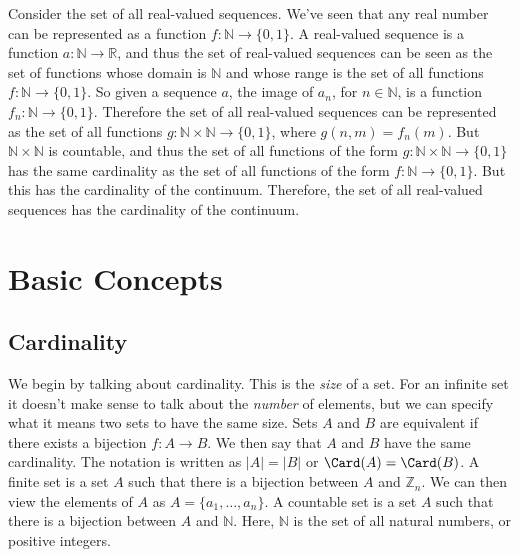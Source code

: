         \begin{lexample}
            Consider the set of all real-valued sequences. We've seen
            that any real number can be represented as a function
            $f:\mathbb{N}\rightarrow\{0,1\}$. A real-valued sequence
            is a function $a:\mathbb{N}\rightarrow\mathbb{R}$, and
            thus the set of real-valued sequences can be seen as the
            set of functions whose domain is $\mathbb{N}$ and whose
            range is the set of all functions
            $f:\mathbb{N}\rightarrow\{0,1\}$. So given a sequence
            $a$, the image of $a_{n}$, for $n\in\mathbb{N}$, is a
            function $f_{n}:\mathbb{N}\rightarrow\{0,1\}$. Therefore
            the set of all real-valued sequences can be represented
            as the set of all functions
            $g:\mathbb{N}\times\mathbb{N}\rightarrow\{0,1\}$, where
            $g(n,m)=f_{n}(m)$. But $\mathbb{N}\times\mathbb{N}$ is
            countable, and thus the set of all functions of the form
            $g:\mathbb{N}\times\mathbb{N}\rightarrow\{0,1\}$ has the
            same cardinality as the set of all functions of the form
            $f:\mathbb{N}\rightarrow\{0,1\}$. But this has the
            cardinality of the continuum. Therefore, the set of all
            real-valued sequences has the cardinality of the continuum.
        \end{lexample}
\section{Basic Concepts}
    \subsection{Cardinality}
        We begin by talking about cardinality. This is the
        \textit{size} of a set. For an infinite set it
        doesn't make sense to talk about the \textit{number}
        of elements, but we can specify what it means two sets
        to have the same size. Sets $A$ and $B$ are equivalent
        if there exists a bijection $f:A\rightarrow{B}$.
        We then say that $A$ and $B$ have the same cardinality.
        The notation is written as $|A|=|B|$ or
        $\Card(A)=\Card(B)$. A finite set is a set $A$ such that
        there is a bijection between $A$ and $\mathbb{Z}_{n}$.
        We can then view the elements of $A$ as
        $A=\{a_{1},\hdots,a_{n}\}$. A countable set is a set
        $A$ such that there is a bijection between $A$ and
        $\mathbb{N}$. Here, $\mathbb{N}$ is the set of all
        natural numbers, or positive integers.
